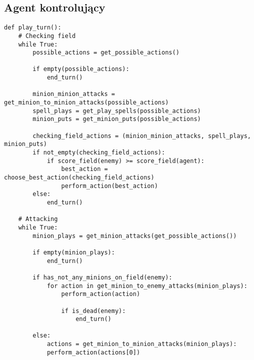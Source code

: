 \subsection{Agent kontrolujący}

\begin{verbatim}
def play_turn():
	# Checking field
	while True:
		possible_actions = get_possible_actions()
		
		if empty(possible_actions):
			end_turn()
	
		minion_minion_attacks = get_minion_to_minion_attacks(possible_actions)
		spell_plays = get_play_spells(possible_actions)
		minion_puts = get_minion_puts(possible_actions)
		
		checking_field_actions = (minion_minion_attacks, spell_plays, minion_puts)
		if not_empty(checking_field_actions):
			if score_field(enemy) >= score_field(agent):
				best_action = choose_best_action(checking_field_actions)
				perform_action(best_action)
		else:
			end_turn()
			
	# Attacking
	while True:
		minion_plays = get_minion_attacks(get_possible_actions())
		
		if empty(minion_plays):
			end_turn()
	
		if has_not_any_minions_on_field(enemy):
			for action in get_minion_to_enemy_attacks(minion_plays):
				perform_action(action)
			
				if is_dead(enemy):
					end_turn()
					
		else:
			actions = get_minion_to_minion_attacks(minion_plays):
			perform_action(actions[0])
			
\end{verbatim}